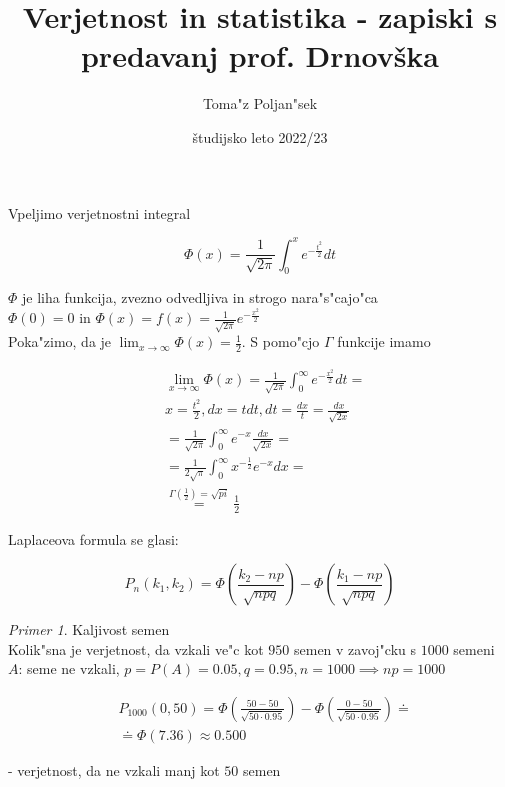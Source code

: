 \documentclass[a4paper,12pt]{article}
\theoremstyle{definition}
\theoremstyle{remark}
\newtheorem*{ex}{Primer}
\begin{document}
\title{Verjetnost in statistika - zapiski s predavanj prof. Drnovška}
\author{
	Toma"z Poljan"sek
}
\date{študijsko leto 2022/23}
\maketitle


\tableofcontents
\newpage
{}





Vpeljimo verjetnostni integral

\begin{equation*}
    \Phi(x) = \frac{1}{\sqrt{2\pi}} \int_0^x e^{-\frac{t^2}{2}} dt
\end{equation*}

$\Phi$ je liha funkcija, zvezno odvedljiva in strogo nara"s"cajo"ca \\
$\Phi(0) = 0$ in $\Phi(x) = f(x) = \frac{1}{\sqrt{2\pi}} e^{-\frac{x^2}{2}}$ \\
Poka"zimo, da je $\lim_{x \to \infty} \Phi(x) = \frac{1}{2}$. S pomo"cjo $\Gamma$ funkcije imamo

\begin{align*}
    &\lim_{x \to \infty} \Phi(x) = \frac{1}{\sqrt{2\pi}} \int_{0}^{\infty} e^{-\frac{x^2}{2}} dt = \\
    &x = \frac{t^2}{2}, dx = t dt, dt = \frac{dx}{t} = \frac{dx}{\sqrt{2x}} \\
    &= \frac{1}{\sqrt{2\pi}} \int_{0}^{\infty} e^{-x} \frac{dx}{\sqrt{2x}} = \\
    &= \frac{1}{2\sqrt{\pi}} \int_{0}^{\infty} x^{-\frac{1}{2}} e^{-x} dx = \\
    &\stackrel{\Gamma(\frac{1}{2}) = \sqrt{pi}}{=} \frac{1}{2}
\end{align*}

Laplaceova formula se glasi:

\begin{equation*}
    P_n(k_1, k_2) = \Phi(\frac{k_2 - np}{\sqrt{npq}}) - \Phi(\frac{k_1 - np}{\sqrt{npq}})
\end{equation*}

\begin{ex}
    Kaljivost semen \\
    Kolik"sna je verjetnost, da vzkali ve"c kot $950$ semen v zavoj"cku s $1000$ semeni \\
    $A$: seme ne vzkali, $p = P(A) = 0.05, q = 0.95, n = 1000 \implies np = 1000$

    \begin{align*}
        &P_{1000}(0,50) = \Phi(\frac{50-50}{\sqrt{50 \cdot 0.95}}) - \Phi(\frac{0-50}{\sqrt{50 \cdot 0.95}}) \doteq \\
        &\doteq \Phi(7.36) \approx 0.500
    \end{align*}

    - verjetnost, da ne vzkali manj kot $50$ semen
\end{ex}
\end{document}
